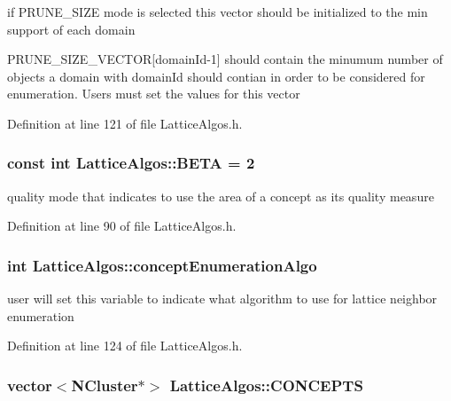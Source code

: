 if PRUNE\_\-SIZE mode is selected this vector should be initialized to the min support of each domain 

PRUNE\_\-SIZE\_\-VECTOR\mbox{[}domainId-\/1\mbox{]} should contain the minumum number of objects a domain with domainId should contian in order to be considered for enumeration. Users must set the values for this vector 

Definition at line 121 of file LatticeAlgos.h.

\hypertarget{class_lattice_algos_a3cf765cdc6bce759203597708324ee9e}{
\subsubsection[{BETA}]{\setlength{\rightskip}{0pt plus 5cm}const int {\bf LatticeAlgos::BETA} = 2}}
\label{class_lattice_algos_a3cf765cdc6bce759203597708324ee9e}


quality mode that indicates to use the area of a concept as its quality measure 



Definition at line 90 of file LatticeAlgos.h.

\hypertarget{class_lattice_algos_a6e7edc3f177497695e1c34b4ae6e6c79}{
\subsubsection[{conceptEnumerationAlgo}]{\setlength{\rightskip}{0pt plus 5cm}int {\bf LatticeAlgos::conceptEnumerationAlgo}}}
\label{class_lattice_algos_a6e7edc3f177497695e1c34b4ae6e6c79}


user will set this variable to indicate what algorithm to use for lattice neighbor enumeration 



Definition at line 124 of file LatticeAlgos.h.

\hypertarget{class_lattice_algos_a006fbb44cdb89ab949bc9f47ed20a6d3}{
\subsubsection[{CONCEPTS}]{\setlength{\rightskip}{0pt plus 5cm}vector$<${\bf NCluster}$\ast$$>$ {\bf LatticeAlgos::CONCEPTS}}}
\label{class_lattice_algos_a006fbb44cdb89ab949bc9f47ed20a6d3}


